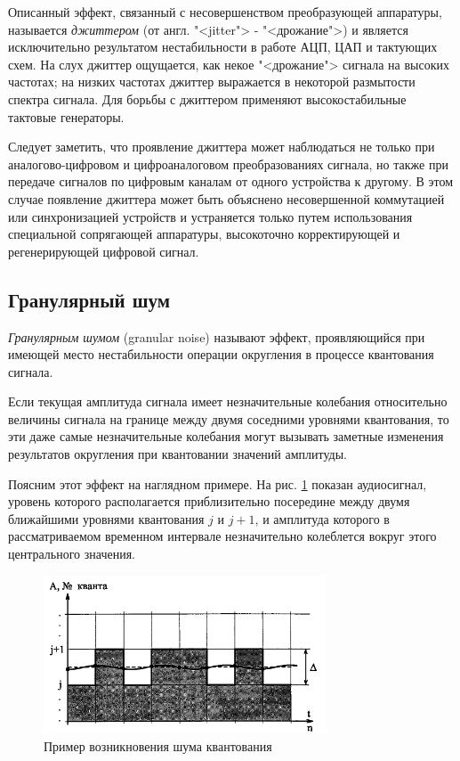 \documentclass[oneside, final, 14pt]{extreport}
\begin{document}
Описанный эффект, связанный с несовершенством преобразующей аппаратуры, называется \textit{джиттером} (от англ. "<jitter"> - "<дрожание">) и является исключительно результатом нестабильности в работе АЦП, ЦАП и тактующих схем. На слух джиттер ощущается, как некое "<дрожание"> сигнала на высоких частотах; на низких частотах джиттер выражается в некоторой размытости спектра сигнала. Для
борьбы с джиттером применяют высокостабильные тактовые генераторы.

Следует заметить, что проявление джиттера может наблюдаться не только при аналогово-цифровом и цифроаналоговом преобразованиях сигнала, но также при передаче сигналов по цифровым каналам от одного устройства к другому. В этом случае появление джиттера может быть объяснено несовершенной коммутацией или синхронизацией устройств и устраняется только путем использования специальной сопрягающей аппаратуры, высокоточно корректирующей и регенерирующей цифровой сигнал.

\subsection{Гранулярный шум}
\textit{Гранулярным шумом} (granular noise) называют эффект, проявляющийся при имеющей место нестабильности операции округления в процессе квантования сигнала. 

Если текущая амплитуда сигнала имеет незначительные колебания относительно величины сигнала на границе между двумя соседними уровнями
квантования, то эти даже самые незначительные колебания могут вызывать заметные изменения результатов округления при квантовании значений амплитуды.

Поясним этот эффект на наглядном примере. На рис. \ref{pic-digital-11} показан аудиосигнал, уровень которого располагается приблизительно посередине между двумя ближайшими уровнями квантования $j$ и $j+1$, и амплитуда которого в рассматриваемом временном интервале незначительно колеблется вокруг этого центрального значения.

\begin{figure}[h]
\centering
\includegraphics[width=0.75\textwidth]{pic-digital-11}
\caption{Пример возникновения шума квантования}
\label{pic-digital-11}
\end{figure}
\end{document}
